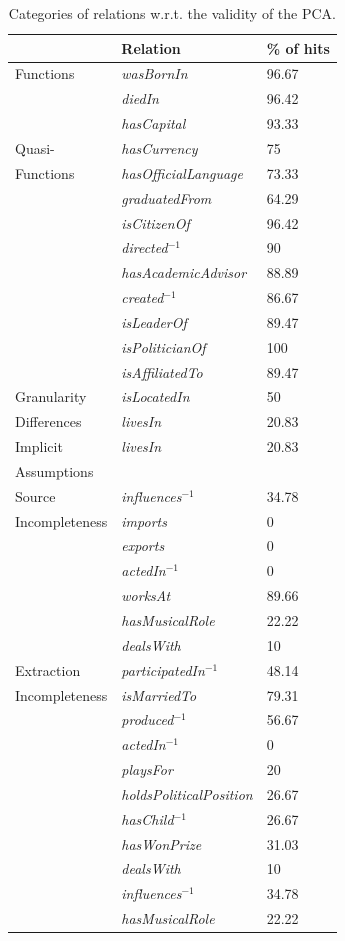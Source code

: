 \begin{table}[t]
\begin{tabular}{p{2.3cm}|p{3cm}| p{2cm}}
\centering{Category}	& Relation 			& \% of hits	\\
\hline
Functions   		&\emph{wasBornIn} 		& 96.67\\
			&\emph{diedIn} 			& 96.42\\
			&\emph{hasCapital}		& 93.33\\
\hline
Quasi- 			&\emph{hasCurrency}		& 75\\
Functions		&\emph{hasOfficialLanguage} 	& 73.33\\
			&\emph{graduatedFrom} 		& 64.29\\
			&\emph{isCitizenOf} 		& 96.42\\
			&\emph{directed}$^{-1}$ 	& 90\\
			&\emph{hasAcademicAdvisor} 	& 88.89\\
			&\emph{created}$^{-1}$  	& 86.67\\
			&\emph{isLeaderOf} 		& 89.47\\
			&\emph{isPoliticianOf}		& 100\\
			&\emph{isAffiliatedTo}		& 89.47\\
\hline
Granularity 		&\emph{isLocatedIn}		& 50\\
Differences		&\emph{livesIn}			& 20.83\\
\hline
Implicit 		&\emph{livesIn} 		& 20.83\\
Assumptions		&&\\
\hline
Source  		&\emph{influences}$^{-1}$	& 34.78\\
Incompleteness		&\emph{imports}			& 0\\
			&\emph{exports}			& 0\\
			&\emph{actedIn}$^{-1}$		& 0\\
			&\emph{worksAt}			& 89.66\\
			&\emph{hasMusicalRole}		& 22.22\\
			&\emph{dealsWith}		& 10\\
\hline
Extraction 		&\emph{participatedIn}$^{-1}$	& 48.14\\
Incompleteness		&\emph{isMarriedTo}		& 79.31\\
			&\emph{produced}$^{-1}$		& 56.67\\
			&\emph{actedIn}$^{-1}$		& 0\\
			&\emph{playsFor}		& 20\\
			&\emph{holdsPoliticalPosition}	& 26.67\\
			&\emph{hasChild}$^{-1}$		& 26.67\\
			&\emph{hasWonPrize}		& 31.03\\
			&\emph{dealsWith}		& 10\\
			&\emph{influences}$^{-1}$	& 34.78\\
			&\emph{hasMusicalRole} 		& 22.22\\
\end{tabular}
\caption{Categories of relations w.r.t. the validity of the PCA.}
\label{PCA_assumption_entities}
\end{table}
\vspace{-0.5cm}
